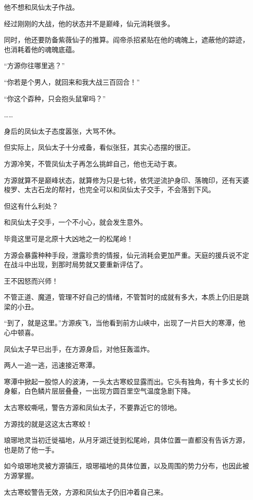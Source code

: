 \begin{this_body}
他不想和凤仙太子作战。

经过刚刚的大战，他的状态并不是巅峰，仙元消耗很多。

同时，他还要防备紫薇仙子的推算。阎帝杀招紧贴在他的魂魄上，遮蔽他的踪迹，也消耗着他的魂魄底蕴。

“方源你往哪里逃？”

“你若是个男人，就回来和我大战三百回合！”

“你这个孬种，只会抱头鼠窜吗？”

……

身后的凤仙太子态度嚣张，大骂不休。

但实际上，凤仙太子十分戒备，看似张狂，其实心态摆的很正。

方源冷笑，不管凤仙太子再怎么挑衅自己，他也无动于衷。

方源就算不是巅峰状态，就算修为只是七转，依凭逆流护身印、落魄印，还有天婆梭罗、太古石龙的帮衬，也完全可以和凤仙太子交手，不会落到下风。

但这有什么利处？

和凤仙太子交手，一个不小心，就会发生意外。

毕竟这里可是北原十大凶地之一的松尾岭！

方源会暴露种种手段，泄露珍贵的情报，仙元消耗会更加严重。天庭的援兵说不定在战斗中出现，到那时局势就又要重新评估了。

王不因怒而兴师！

不管正道、魔道，管理不好自己的情绪，不管暂时的成就有多大，本质上仍旧是跳梁的小丑。

“到了，就是这里。”方源疾飞，当他看到前方山峡中，出现了一片巨大的寒潭，他心中顿喜。

凤仙太子早已出手，在方源身后，对他狂轰滥炸。

两人一追一逃，迅速接近寒潭。

寒潭中掀起一股惊人的波涛，一头太古寒蛟显露而出。它头有独角，有十多丈长的身躯，白色鳞片层层叠叠，一出现方圆百里空气温度急剧下降。

太古寒蛟嘶吼，警告方源和凤仙太子，不要靠近它的领地。

方源找的就是这这太古寒蛟！

琅琊地灵当初迁徙福地，从月牙湖迁徙到松尾岭，具体位置一直都没有告诉方源，也是防了他一手。

如今琅琊地灵被方源镇压，琅琊福地的具体位置，以及周围的势力分布，也因此被方源掌握。

太古寒蛟警告无效，方源和凤仙太子仍旧冲着自己来。


\end{this_body}
